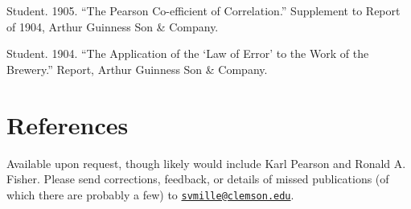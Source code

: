 \documentclass[11pt,]{article}
\begin{document}
Student. 1905. ``The Pearson Co-efficient of Correlation.'' Supplement
to Report of 1904, Arthur Guinness Son \& Company.

Student. 1904. ``The Application of the `Law of Error' to the Work of
the Brewery.'' Report, Arthur Guinness Son \& Company.

\hypertarget{references}{%
\section{References}\label{references}}

Available upon request, though likely would include Karl Pearson and
Ronald A. Fisher. Please send corrections, feedback, or details of
missed publications (of which there are probably a few) to
\href{mailto:svmille@clemson.edu}{\nolinkurl{svmille@clemson.edu}}.
\end{document}
